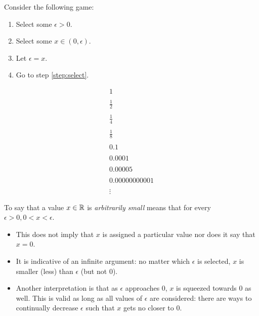 \documentclass[letterpaper,12pt,fleqn]{article}
\newcommand{\e}{\epsilon}
\begin{document}
\begin{example}
  Consider the following game:
  \begin{enumerate}
  \item Select some \(\e>0\).
  \item\label{step:select} Select some \(x\in(0,\e)\).
  \item Let \(\e=x\).
  \item Go to step \ref{step:select}.
  \end{enumerate}

  \[\begin{array}{l}
  1 \\
  \\
  \frac{1}{2} \\
  \\
  \frac{1}{4} \\
  \\
  \frac{1}{8} \\
  \\
  0.1 \\
  \\
  0.0001 \\
  \\
  0.00005 \\
  \\
  0.00000000001 \\
  \\
  \vdots
  \end{array}\]
\end{example}

\begin{definition}
  To say that a value \(x\in\mathbb{R}\) is \emph{arbitrarily small} means that for every \(\e>0,0<x<\e\).
\end{definition}

\begin{itemize}[left=0in]
\item This does not imply that \(x\) is assigned a particular value nor does it say that \(x=0\).
\item It is indicative of an infinite argument: no matter which \(\e\) is selected, \(x\) is smaller (less) than
  \(\e\) (but not \(0\)).
\item Another interpretation is that as \(\e\) approaches \(0\), \(x\) is squeezed towards \(0\) as well.  This is
  valid as long as all values of \(\e\) are considered: there are ways to continually decrease \(\e\) such that
  \(x\) gets no closer to \(0\).
\end{itemize}
\end{document}
